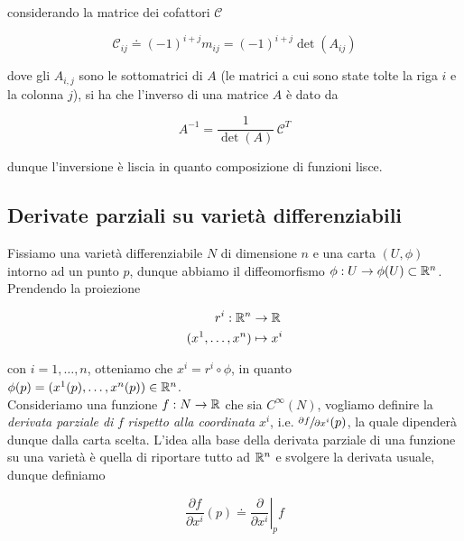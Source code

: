 considerando la matrice dei cofattori $ \mathcal{C} $

\begin{equation}
	\mathcal{C}_{ij} \doteq (-1)^{i+j} m_{ij} = (-1)^{i+j} \det(A_{ij})
\end{equation}

dove gli $ A_{i,j} $ sono le sottomatrici di $ A $ (le matrici a cui sono state tolte la riga $ i $ e la colonna $ j $), si ha che l'inverso di una matrice $ A $ è dato da

\begin{equation}
	A^{-1} = \dfrac{1}{\det(A)} \, \mathcal{C}^{T}
\end{equation}

dunque l'inversione è liscia in quanto composizione di funzioni lisce.

\subsection{Derivate parziali su varietà differenziabili}

Fissiamo una varietà differenziabile $ N $ di dimensione $ n $ e una carta $ (U,\phi) $ intorno ad un punto $ p $, dunque abbiamo il diffeomorfismo $ \phi : U \to \phi(U) \subset \mathbb{R}^{n} $. Prendendo la proiezione

\begin{align}
	\begin{split}
		r^{i} : \mathbb{R}^{n} &\to \mathbb{R}\\
		(x^{1},\dots,x^{n}) &\mapsto x^{i}
	\end{split}
\end{align}

con $ i=1,\dots,n $, otteniamo che $ x^{i} = r^{i} \circ \phi $, in quanto $ \phi(p) = (x^{1}(p),\dots,x^{n}(p)) \in \mathbb{R}^{n} $.\\
Consideriamo una funzione $ f : N \to \mathbb{R} $ che sia $ C^{\infty}(N) $, vogliamo definire la \textit{derivata parziale di} $ f $ \textit{rispetto alla coordinata} $ x^{i} $, i.e. $ \sfrac{\partial f}{\partial x^{i}} (p) $, la quale dipenderà dunque dalla carta scelta. L'idea alla base della derivata parziale di una funzione su una varietà è quella di riportare tutto ad $ \mathbb{R}^{n} $ e svolgere la derivata usuale, dunque definiamo

\begin{equation}
	\dfrac{\partial f}{\partial x^{i}} (p) \doteq \left. \dfrac{\partial}{\partial x^{i}} \right|_{p} f
\end{equation}

